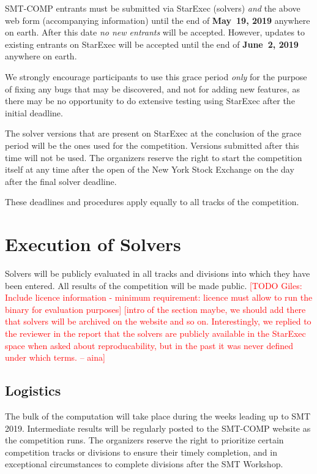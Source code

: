 \documentclass[12pt]{article}
\newcommand{\rem}[1]{\textcolor{red}{[#1]}}
\newcommand{\todo}[1]{\rem{TODO #1}}
\newcommand{\an}[1]{\rem{#1 -- aina}}
\begin{document}
SMT-COMP entrants must be submitted via StarExec (solvers) \emph{and}
the above web form (accompanying information) until the end of
{\bf May~19, 2019} anywhere on earth.
After this date \emph{no new entrants} will be accepted.
However, updates to existing entrants on StarExec
will be accepted until the end of {\bf June~2, 2019} anywhere on earth.

We strongly encourage participants to use this grace period
\emph{only} for the purpose of fixing any bugs that may be discovered,
and not for adding new features, as there may be no opportunity to do
extensive testing using StarExec after the initial deadline.

The solver versions that are present on StarExec at the conclusion of
the grace period will be the ones used for the competition.  Versions
submitted after this time will not be used.  The organizers reserve
the right to start the competition itself at any time after the open
of the New York Stock Exchange on the day after the final solver
deadline.

These deadlines and procedures apply equally to all tracks of the
competition.




\section{Execution of Solvers}

Solvers will be publicly evaluated in all tracks and divisions into
which they have been entered.  All results of the competition will be
made public.
\todo{Giles: Include licence information - minimum requirement: licence must allow to run the binary for evaluation purposes}
\an{intro of the section maybe, we should add there that solvers will be archived on the website and so on. Interestingly, we replied to the reviewer in the report that the solvers are publicly available in the StarExec space when asked about reproducability, but in the past it was never defined under which terms.}


\subsection{Logistics}
\label{sec:logistics}

%
The bulk of the computation will take place during the weeks leading
up to SMT 2019.  Intermediate results will be regularly posted to the
SMT-COMP website as the competition runs.
%
The organizers reserve the right to prioritize certain competition
tracks or divisions to ensure their timely completion, and in
exceptional circumstances to complete divisions after the SMT
Workshop.
\end{document}
